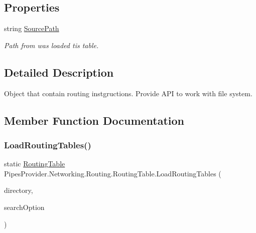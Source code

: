 \subsection*{Properties}
\begin{DoxyCompactItemize}
\item 
string \mbox{\hyperlink{class_pipes_provider_1_1_networking_1_1_routing_1_1_routing_table_af756c825762d5434f5b934a1c1b2d3eb}{Source\+Path}}
\begin{DoxyCompactList}\small\item\em Path from was loaded tis table. \end{DoxyCompactList}\end{DoxyCompactItemize}


\subsection{Detailed Description}
Object that contain routing instgructions. Provide A\+PI to work with file system. 



\subsection{Member Function Documentation}
\mbox{\label{class_pipes_provider_1_1_networking_1_1_routing_1_1_routing_table_a13c2778abb1d14e7e8e4a2ae51d315ac}} 
\subsubsection{\texorpdfstring{Load\+Routing\+Tables()}{LoadRoutingTables()}}
{\footnotesize\ttfamily static \mbox{\hyperlink{class_pipes_provider_1_1_networking_1_1_routing_1_1_routing_table}{Routing\+Table}} Pipes\+Provider.\+Networking.\+Routing.\+Routing\+Table.\+Load\+Routing\+Tables (\begin{DoxyParamCaption}\item[{string}]{directory,  }\item[{Search\+Option}]{search\+Option }\end{DoxyParamCaption})\hspace{0.3cm}{\ttfamily [static]}}



